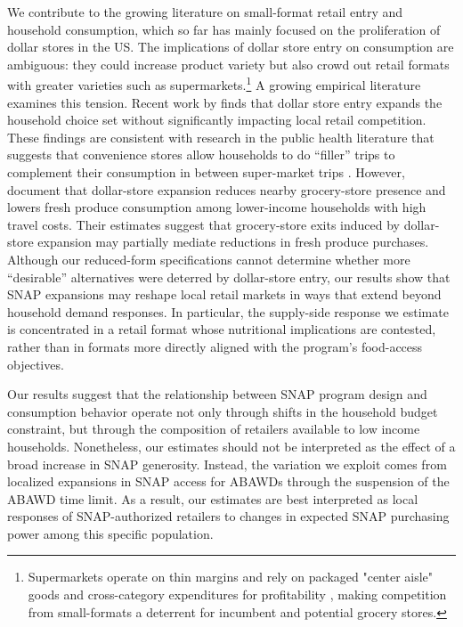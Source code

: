 \documentclass[12pt]{article}
\begin{document}
We contribute to the growing literature on small-format retail entry and household consumption, which so far has mainly focused on the proliferation of dollar stores in the US. The  implications of dollar store entry on consumption are ambiguous: they could increase product variety but also crowd out retail formats with greater varieties such as supermarkets.\footnote{Supermarkets operate on thin margins and rely on packaged "center aisle" goods and cross-category expenditures for profitability \citep{malinovskaya2026destination}, making competition from small-formats a deterrent for incumbent and potential grocery stores.} A growing empirical literature examines this tension. Recent work by  \cite{schneier2025dollarstore} finds that dollar store entry expands the household choice set without significantly impacting local retail competition. These findings are consistent with research in the public health literature that suggests that convenience stores allow households to do ``filler'' trips to complement their consumption in between super-market trips \citep{harnack2019importance}. However, \cite{caoui2026impact} document that dollar-store expansion reduces nearby grocery-store presence and lowers fresh produce consumption among lower-income households with high travel costs. Their estimates suggest that grocery-store exits induced by dollar-store expansion may partially mediate reductions in fresh produce purchases. Although our reduced-form specifications cannot determine whether more ``desirable'' alternatives were deterred by dollar-store entry, our results show that SNAP expansions may reshape local retail markets in ways that extend beyond household demand responses. In particular, the supply-side response we estimate is concentrated in a retail format whose nutritional implications are contested, rather than in formats more directly aligned with the program's food-access objectives. 

Our results suggest that the relationship between SNAP program design and consumption behavior operate not only through shifts in the household budget constraint, but through the composition of retailers available to low income households. Nonetheless, our estimates should not be interpreted as the effect of a broad increase in SNAP generosity. Instead, the variation we exploit comes from localized expansions in SNAP access for ABAWDs through the suspension of the ABAWD time limit. As a result, our estimates are best interpreted as local responses of SNAP-authorized retailers to changes in expected SNAP purchasing power among this specific population. 
\end{document}
